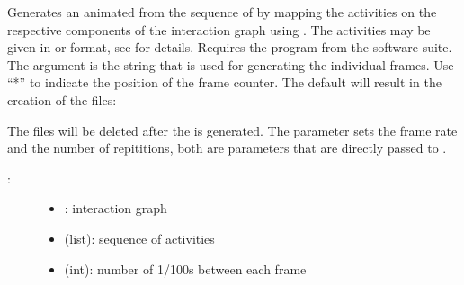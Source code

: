 \documentclass[letterpaper,10pt,english]{sphinxmanual}
\begin{document}
\begin{fulllineitems}
\label{\detokenize{InteractionGraphs:PyBoolNet.InteractionGraphs.activities2animation}}
Generates an animated  from the sequence of  by mapping the activities on
the respective components of the interaction graph using {\hyperref[\detokenize{InteractionGraphs:add-style-activities}]{}}.
The activities may be given in  or  format, see {\hyperref[\detokenize{Manual:states-subspaces-paths}]{}} for details.
Requires the program  from the {\hyperref[\detokenize{Installation:installation-imagemagick}]{}} software suite.
The argument  is the string that is used for generating the individual frames.
Use “*” to indicate the position of the frame counter.
The default  will result in the creation of the files:

\begin{sphinxVerbatim}[commandchars=\\\{\}]
  
\end{sphinxVerbatim}

The files will be deleted after the  is generated.
The  parameter sets the frame rate and  the number of repititions,
both are parameters that are directly passed to .
\begin{description}
\item[{:}] \leavevmode\begin{itemize}
\item {} 
: interaction graph

\item {} 
 (list): sequence of activities

\item {} 
 (int): number of 1/100s between each frame


\end{itemize}
\end{description}
\end{fulllineitems}
\end{document}
